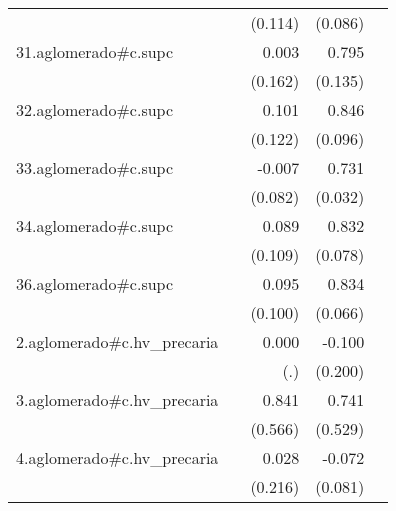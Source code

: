 {\begin{longtable}{l*{4}{D{.}{.}{-1}}}
            &                     &     (0.114)         &     (0.086)         &                     \\
\addlinespace
31.aglomerado#c.supc&                     &       0.003         &       0.795\sym{***}&                     \\
            &                     &     (0.162)         &     (0.135)         &                     \\
\addlinespace
32.aglomerado#c.supc&                     &       0.101         &       0.846\sym{***}&                     \\
            &                     &     (0.122)         &     (0.096)         &                     \\
\addlinespace
33.aglomerado#c.supc&                     &      -0.007         &       0.731\sym{***}&                     \\
            &                     &     (0.082)         &     (0.032)         &                     \\
\addlinespace
34.aglomerado#c.supc&                     &       0.089         &       0.832\sym{***}&                     \\
            &                     &     (0.109)         &     (0.078)         &                     \\
\addlinespace
36.aglomerado#c.supc&                     &       0.095         &       0.834\sym{***}&                     \\
            &                     &     (0.100)         &     (0.066)         &                     \\
\addlinespace
2.aglomerado#c.hv\_precaria&                     &       0.000         &      -0.100         &                     \\
            &                     &         (.)         &     (0.200)         &                     \\
\addlinespace
3.aglomerado#c.hv\_precaria&                     &       0.841         &       0.741         &                     \\
            &                     &     (0.566)         &     (0.529)         &                     \\
\addlinespace
4.aglomerado#c.hv\_precaria&                     &       0.028         &      -0.072         &                     \\
            &                     &     (0.216)         &     (0.081)         &                     \\

\end{longtable}}
